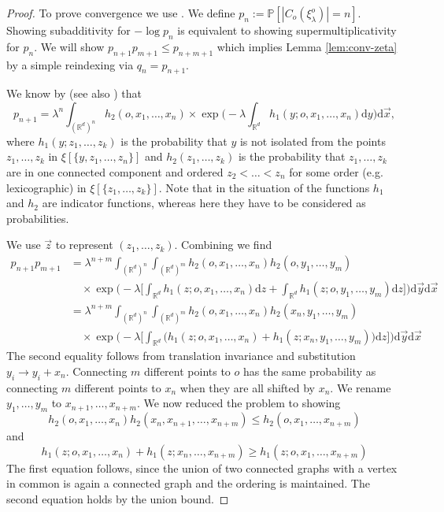 \documentclass[a4paper,12pt]{scrartcl}
\renewcommand{\P}{\mathbb{P}}
\renewcommand{\d}{\mathrm{d}}
\theoremstyle{definition}
\theoremstyle{remark}
\begin{document}
  \begin{proof}
    To prove convergence we use . We define $p_n:=\P[|C_o(\xi_{\lambda}^o)|= n]$. Showing subadditivity for $-\log p_n$ is equivalent to showing supermultiplicativity for $p_n$. We will show $p_{n+1}p_{m+1}\leq p_{n+m+1}$ which implies Lemma \ref{lem:conv-zeta} by a simple reindexing via $q_n=p_{n+1}$.

    We know by \cite{penrose1991} (see also \cite[Proposition 6.2]{meester1996continuum}) that
    $$
    p_{n+1}
    =
    {\lambda^n}
    \int_{(\mathbb R^d)^n}
    h_2(o,x_1,\dots, x_n)
    \times
    \exp \Big(
      -\lambda
      \int_{\mathbb R^d}
      h_1(y; o, x_1,\dots, x_n)
      \d y
    \Big)
    \d\vec x,
    $$
    where $h_1(y;z_1,\dots, z_k)$ is the probability that $y$ is not isolated from the points $z_1,\dots, z_k$ in $\xi[\{y, z_1,\dots, z_n\}]$ and $h_2(z_1,\dots, z_k)$ is the probability that $z_1,\dots, z_k$ are in one connected component and ordered $z_2<\dots<z_n$ for some order (e.g. lexicographic) in $\xi[\{z_1,\dots, z_k\}]$.
    Note that in the situation of \cite[Theorem 10.1]{penrose2003random}
    the functions $h_1$ and $h_2$ are indicator functions, whereas here they have to be considered as probabilities.

    We use $\vec z$ to represent $(z_1,\dots, z_k)$.
    Combining we find
    \begin{align*}
      p_{n+1}p_{m+1}
      & =
      \lambda^{n+m}
      \int_{(\mathbb R^d)^n}
      \int_{(\mathbb R^d)^m}
      h_2(o,x_1,\dots, x_n)
      h_2(o,y_1,\dots, y_m)
      \\&\quad
      \times    %
      \exp\bigg(
        -\lambda
        \Big[
          \int_{\mathbb R^d}
          h_1(z;o,x_1,\dots,x_n)
          \d z
          +
          \int_{\mathbb R^d}
          h_1(z;o,y_1,\dots,y_m)
          \d z
      \Big]\bigg)
      \d \vec y \d\vec x \\
      & =               %
      \lambda^{n+m}
      \int_{(\mathbb R^d)^n}
      \int_{(\mathbb R^d)^m}
      h_2(o,x_1,\dots, x_n)
      h_2(x_n,y_1,\dots, y_m)
      \\&\quad
      \times    %
      \exp\bigg(
        -\lambda
        \Big[
          \int_{\mathbb R^d}
          \big(
            h_1(z;o,x_1,\dots,x_n)
            +
            h_1(z;x_n,y_1,\dots,y_m)
          \big)
          \d z
      \Big]\bigg)
      \d \vec y \d\vec x
    \end{align*}
    The second equality follows from translation invariance and substitution $y_i\to y_i+x_n$. Connecting $m$ different points to $o$ has the same probability as connecting $m$ different points to $x_n$ when they are all shifted by $x_n$. We rename $y_1,\dots, y_m$ to $x_{n+1},\dots, x_{n+m}$. We now reduced the problem to showing
    $$
    h_2(o,x_1,\dots, x_n)
    h_2(x_n ,x_{n+1},\dots, x_{n+m})
    \leq
    h_2(o, x_1,\dots, x_{n+m})
    $$
    and
    $$
    h_1(z; o, x_1,\dots,x_n)
    +
    h_1(z; x_n,\dots, x_{n+m})
    \geq
    h_1(z; o, x_1,\dots, x_{n+m})
    $$
    The first equation follows, since the union of two connected graphs with a vertex in common is again a connected graph and the ordering is maintained. The second equation holds by the union bound.


\end{proof}
\end{document}

